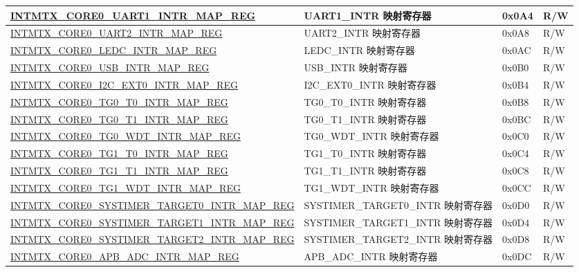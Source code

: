 \begin{longtable}{ | p{10cm} | p{10cm} | p{1.3cm} | p{1cm} | }
\hyperref[regdesc:INTMTXCORE0UART1INTRMAPREG]{INTMTX\_CORE0\_UART1\_INTR\_MAP\_REG} & UART1\_INTR 映射寄存器 & 0x0A4 & R/W  \\ \hline
\hyperref[regdesc:INTMTXCORE0UART2INTRMAPREG]{INTMTX\_CORE0\_UART2\_INTR\_MAP\_REG} & UART2\_INTR 映射寄存器 & 0x0A8 & R/W  \\ \hline
\hyperref[regdesc:INTMTXCORE0LEDCINTRMAPREG]{INTMTX\_CORE0\_LEDC\_INTR\_MAP\_REG} & LEDC\_INTR 映射寄存器 & 0x0AC & R/W  \\ \hline
\hyperref[regdesc:INTMTXCORE0USBINTRMAPREG]{INTMTX\_CORE0\_USB\_INTR\_MAP\_REG} & USB\_INTR 映射寄存器 & 0x0B0 & R/W  \\ \hline
\hyperref[regdesc:INTMTXCORE0I2CEXT0INTRMAPREG]{INTMTX\_CORE0\_I2C\_EXT0\_INTR\_MAP\_REG} & I2C\_EXT0\_INTR 映射寄存器 & 0x0B4 & R/W  \\ \hline
\hyperref[regdesc:INTMTXCORE0TG0T0INTRMAPREG]{INTMTX\_CORE0\_TG0\_T0\_INTR\_MAP\_REG} & TG0\_T0\_INTR 映射寄存器 & 0x0B8 & R/W  \\ \hline
\hyperref[regdesc:INTMTXCORE0TG0T1INTRMAPREG]{INTMTX\_CORE0\_TG0\_T1\_INTR\_MAP\_REG} & TG0\_T1\_INTR 映射寄存器 & 0x0BC & R/W  \\ \hline
\hyperref[regdesc:INTMTXCORE0TG0WDTINTRMAPREG]{INTMTX\_CORE0\_TG0\_WDT\_INTR\_MAP\_REG} & TG0\_WDT\_INTR 映射寄存器 & 0x0C0 & R/W  \\ \hline
\hyperref[regdesc:INTMTXCORE0TG1T0INTRMAPREG]{INTMTX\_CORE0\_TG1\_T0\_INTR\_MAP\_REG} & TG1\_T0\_INTR 映射寄存器 & 0x0C4 & R/W  \\ \hline
\hyperref[regdesc:INTMTXCORE0TG1T1INTRMAPREG]{INTMTX\_CORE0\_TG1\_T1\_INTR\_MAP\_REG} & TG1\_T1\_INTR 映射寄存器 & 0x0C8 & R/W  \\ \hline
\hyperref[regdesc:INTMTXCORE0TG1WDTINTRMAPREG]{INTMTX\_CORE0\_TG1\_WDT\_INTR\_MAP\_REG} & TG1\_WDT\_INTR 映射寄存器 & 0x0CC & R/W  \\ \hline
\hyperref[regdesc:INTMTXCORE0SYSTIMERTARGET0INTRMAPREG]{INTMTX\_CORE0\_SYSTIMER\_TARGET0\_INTR\_MAP\_REG} & SYSTIMER\_TARGET0\_INTR 映射寄存器 & 0x0D0 & R/W  \\ \hline
\hyperref[regdesc:INTMTXCORE0SYSTIMERTARGET1INTRMAPREG]{INTMTX\_CORE0\_SYSTIMER\_TARGET1\_INTR\_MAP\_REG} & SYSTIMER\_TARGET1\_INTR 映射寄存器 & 0x0D4 & R/W  \\ \hline
\hyperref[regdesc:INTMTXCORE0SYSTIMERTARGET2INTRMAPREG]{INTMTX\_CORE0\_SYSTIMER\_TARGET2\_INTR\_MAP\_REG} & SYSTIMER\_TARGET2\_INTR 映射寄存器 & 0x0D8 & R/W  \\ \hline
\hyperref[regdesc:INTMTXCORE0APBADCINTRMAPREG]{INTMTX\_CORE0\_APB\_ADC\_INTR\_MAP\_REG} & APB\_ADC\_INTR 映射寄存器 & 0x0DC & R/W  \\ \hline

\end{longtable}
